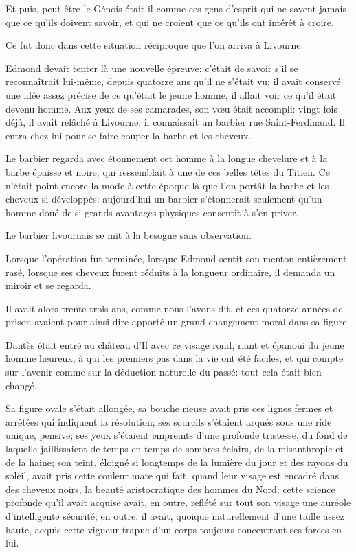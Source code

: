 Et puis, peut-être le Génois était-il comme ces gens d'esprit qui ne savent jamais que ce qu'ils doivent savoir, et qui ne croient que ce qu'ils ont intérêt à croire.

Ce fut donc dans cette situation réciproque que l'on arriva à Livourne.

Edmond devait tenter là une nouvelle épreuve: c'était de savoir s'il se reconnaîtrait lui-même, depuis quatorze ans qu'il ne s'était vu; il avait conservé une idée assez précise de ce qu'était le jeune homme, il allait voir ce qu'il était devenu homme. Aux yeux de ses camarades, son vœu était accompli: vingt fois déjà, il avait relâché à Livourne, il connaissait un barbier rue Saint-Ferdinand. Il entra chez lui pour se faire couper la barbe et les cheveux.

Le barbier regarda avec étonnement cet homme à la longue chevelure et à la barbe épaisse et noire, qui ressemblait à une de ces belles têtes du Titien. Ce n'était point encore la mode à cette époque-là que l'on portât la barbe et les cheveux si développés: aujourd'hui un barbier s'étonnerait seulement qu'un homme doué de si grands avantages physiques consentît à s'en priver.

Le barbier livournais se mit à la besogne sans observation.

Lorsque l'opération fut terminée, lorsque Edmond sentit son menton entièrement rasé, lorsque ses cheveux furent réduits à la longueur ordinaire, il demanda un miroir et se regarda.

Il avait alors trente-trois ans, comme nous l'avons dit, et ces quatorze années de prison avaient pour ainsi dire apporté un grand changement moral dans sa figure.

Dantès était entré au château d'If avec ce visage rond, riant et épanoui du jeune homme heureux, à qui les premiers pas dans la vie ont été faciles, et qui compte sur l'avenir comme sur la déduction naturelle du passé: tout cela était bien changé.

Sa figure ovale s'était allongée, sa bouche rieuse avait pris ces lignes fermes et arrêtées qui indiquent la résolution; ses sourcils s'étaient arqués sous une ride unique, pensive; ses yeux s'étaient empreints d'une profonde tristesse, du fond de laquelle jaillissaient de temps en temps de sombres éclairs, de la misanthropie et de la haine; son teint, éloigné si longtemps de la lumière du jour et des rayons du soleil, avait pris cette couleur mate qui fait, quand leur visage est encadré dans des cheveux noirs, la beauté aristocratique des hommes du Nord; cette science profonde qu'il avait acquise avait, en outre, reflété sur tout son visage une auréole d'intelligente sécurité; en outre, il avait, quoique naturellement d'une taille assez haute, acquis cette vigueur trapue d'un corps toujours concentrant ses forces en lui.

